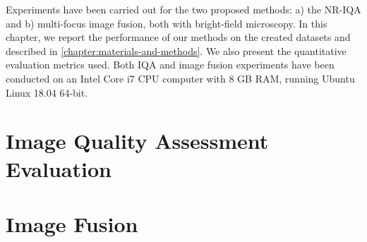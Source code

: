 Experiments have been carried out for the two proposed methods: a) the NR-IQA  and b) multi-focus image fusion, both with bright-field microscopy. In this chapter, we report the performance of our methods on the created datasets and described in \autoref{chapter:materials-and-methods}. We also present the quantitative evaluation metrics used. Both IQA and image fusion experiments have been conducted on an Intel Core i7 CPU computer with 8 GB RAM, running Ubuntu Linux 18.04 64-bit.



\section{Image Quality Assessment Evaluation}


\section{Image Fusion}


